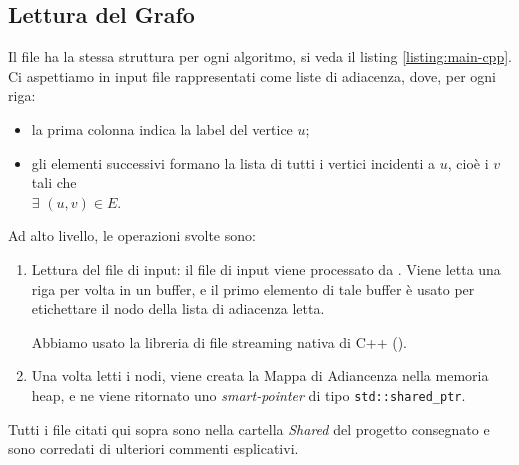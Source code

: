 \subsection{Lettura del Grafo}

\noindent Il file  ha la stessa struttura per ogni algoritmo, si veda il listing \ref{listing:main-cpp}.
Ci aspettiamo in input file rappresentati come liste di adiacenza, dove, per ogni riga:

\begin{itemize}
    \item la prima colonna indica la label del vertice $u$;
    \item gli elementi successivi formano la lista di tutti i vertici incidenti a $u$, cioè i $v$ tali che \\ $\exists$ $(u, v) \in E$.
\end{itemize}

Ad alto livello, le operazioni svolte sono:

\begin{enumerate}
    \item Lettura del file di input: il file di input viene processato da . Viene letta una riga per volta in un buffer, e il primo elemento di tale buffer è usato per etichettare il nodo della lista di adiacenza letta.

    \noindent Abbiamo usato la libreria di file streaming nativa di C++ ().

    \item Una volta letti i nodi, viene creata la Mappa di Adiancenza nella memoria heap, e ne viene ritornato uno \textit{smart-pointer} di tipo \texttt{std::shared_ptr}.
\end{enumerate}

\noindent Tutti i file citati qui sopra sono nella cartella \textit{Shared} del progetto consegnato e sono corredati di ulteriori commenti esplicativi.



